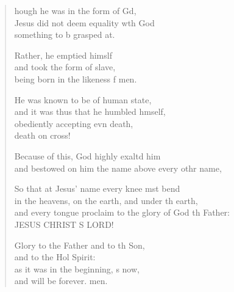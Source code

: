 \settowidth{\versewidth}{and every tongue proclaim to the glory of God the Father: *}
\begin{verse}%
  \begin{patverse}
    hough he was in the form of Gd,\Flex\\
    Jesus did not deem equality w\pointup{\i}th God\Med\\
    something to b grasped at.
    
    Rather, he emptied himslf\Flex\\
    and took the form of  slave,\Med\\
    being born in the likeness f men.
    
    He was known to be of human state,\Med\\
    and it was thus that he humbled h\pointup{\i}mself,\\
    obediently accepting evn death,\Med\\
    death on  cross!
    
    Because of this, God highly exaltd him\Med\\
    and bestowed on him the name above every othr name,
    
    So that at Jesus’ name every knee mst bend\Med\\
    in the heavens, on the earth, and under th earth,\\
    and every tongue proclaim to the glory of God th Father:\Med\\
    JESUS CHRIST S LORD!

    Glory to the Father and to th Son,\Med\\
    and to the Hol Spirit:\\
    as it was in the beginning, \pointup{\i}s now,\Med\\
    and will be forever. men.
  \end{patverse}
\end{verse}
